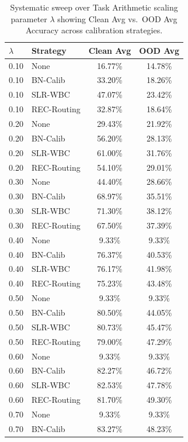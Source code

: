 \documentclass{article}
\theoremstyle{plain}
\theoremstyle{definition}
\theoremstyle{remark}
\begin{document}
\begin{table}[H]
\caption{Systematic sweep over Task Arithmetic scaling parameter $\lambda$ showing Clean Avg vs.\ OOD Avg Accuracy across calibration strategies.}
\label{tab:lambda_sweep}
\vskip 0.15in
\begin{center}
\begin{small}
\begin{sc}
\begin{tabular}{llcc}
\toprule
$\lambda$ & Strategy & Clean Avg & OOD Avg \\
\midrule
0.10 & None & 16.77\% & 14.78\% \\
0.10 & BN-Calib & 33.20\% & 18.26\% \\
0.10 & SLR-WBC & 47.07\% & 23.42\% \\
0.10 & REC-Routing & 32.87\% & 18.64\% \\
\midrule
0.20 & None & 29.43\% & 21.92\% \\
0.20 & BN-Calib & 56.20\% & 28.13\% \\
0.20 & SLR-WBC & 61.00\% & 31.76\% \\
0.20 & REC-Routing & 54.10\% & 29.01\% \\
\midrule
0.30 & None & 44.40\% & 28.66\% \\
0.30 & BN-Calib & 68.97\% & 35.51\% \\
0.30 & SLR-WBC & 71.30\% & 38.12\% \\
0.30 & REC-Routing & 67.50\% & 37.39\% \\
\midrule
0.40 & None & 9.33\% & 9.33\% \\
0.40 & BN-Calib & 76.37\% & 40.53\% \\
0.40 & SLR-WBC & 76.17\% & 41.98\% \\
0.40 & REC-Routing & 75.23\% & 43.48\% \\
\midrule
0.50 & None & 9.33\% & 9.33\% \\
0.50 & BN-Calib & 80.50\% & 44.05\% \\
0.50 & SLR-WBC & 80.73\% & 45.47\% \\
0.50 & REC-Routing & 79.00\% & 47.29\% \\
\midrule
0.60 & None & 9.33\% & 9.33\% \\
0.60 & BN-Calib & 82.27\% & 46.72\% \\
0.60 & SLR-WBC & 82.53\% & 47.78\% \\
0.60 & REC-Routing & 81.70\% & 49.30\% \\
\midrule
0.70 & None & 9.33\% & 9.33\% \\
0.70 & BN-Calib & 83.27\% & 48.23\% \\

\end{tabular}
\end{sc}
\end{small}
\end{center}
\end{table}
\end{document}
